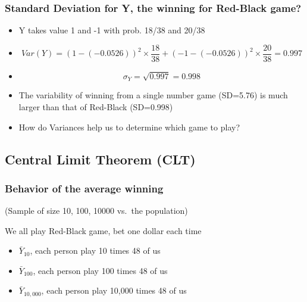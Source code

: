 \documentclass[
  ignorenonframetext,
]{beamer}
\providecommand{\tightlist}{%
  \setlength{\itemsep}{0pt}\setlength{\parskip}{0pt}}
\begin{document}
\begin{frame}
\frametitle{Standard Deviation for Y, the winning for Red-Black game?}

\begin{itemize}
\item
  Y takes value 1 and -1 with prob. 18/38 and 20/38
\item
  \[\scriptstyle Var(Y)=(1 - (- 0.0526))^2  \times \frac{18}{38} + (- 1 -(- 0.0526))^2 \times \frac{20}{38} = 0.997\]
\item
  \[\scriptstyle \sigma_Y = \sqrt{0.997} =  0.998\]
\item
  The variability of winning from a single number game (SD=5.76) is much
  larger than that of Red-Black (SD=0.998)
\item
  How do Variances help us to determine which game to play?
\end{itemize}
\end{frame}

\hypertarget{central-limit-theorem-clt}{%
\subsection{Central Limit Theorem
(CLT)}\label{central-limit-theorem-clt}}

\begin{frame}
\frametitle{Behavior of the average winning}

(Sample of size 10, 100, 10000 vs.~the population)

We all play Red-Black game, bet one dollar each time

\begin{itemize}
\tightlist
\item
  \(\bar{Y}_{10}\), each person play 10 times 48 of us
\item
  \(\bar{Y}_{100}\), each person play 100 times 48 of us
\item
  \(\bar{Y}_{10,000}\), each person play 10,000 times 48 of us
\end{itemize}
\end{frame}
\end{document}
